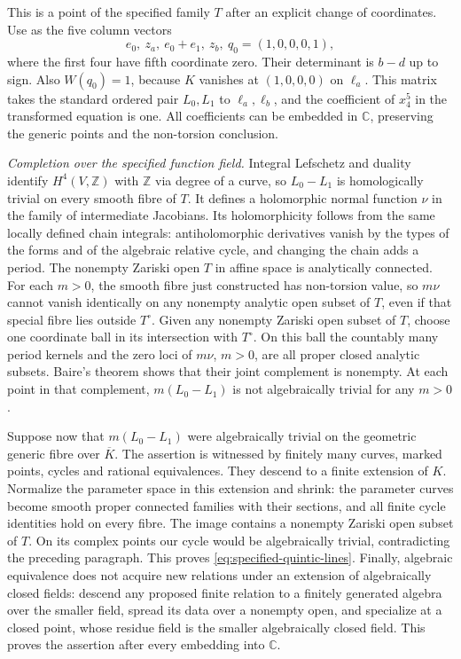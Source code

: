This is a point of the specified family $T$ after an explicit change
of coordinates. Use as the five column vectors
\[
 e_0,\ z_a,\ e_0+e_1,\ z_b,\ q_0=(1,0,0,0,1),
\]
where the first four have fifth coordinate zero. Their determinant
is $b-d$ up to sign. Also $W(q_0)=1$, because $K$ vanishes at
$(1,0,0,0)$ on $\ell_a$. This matrix takes the standard ordered
pair $L_0,L_1$ to $\ell_a,\ell_b$, and the coefficient of $x_4^5$
in the transformed equation is one. All coefficients can be
embedded in $\mathbb C$, preserving the generic points and the
non-torsion conclusion.

\emph{Completion over the specified function field.}
Integral Lefschetz and duality identify $H^4(V,\mathbb Z)$ with
$\mathbb Z$ via degree of a curve, so $L_0-L_1$ is homologically
trivial on every smooth fibre of $T$. It defines a holomorphic
normal function $\nu$ in the family of intermediate Jacobians.
Its holomorphicity follows from the same locally defined chain
integrals: antiholomorphic derivatives vanish by the types of the
forms and of the algebraic relative cycle, and changing the chain
adds a period. The nonempty Zariski open $T$ in affine space is
analytically connected. For each $m>0$, the smooth fibre just
constructed has non-torsion value, so $m\nu$ cannot vanish identically
on any nonempty analytic open subset of $T$, even if that special
fibre lies outside $T^\circ$. Given any nonempty Zariski open subset
of $T$, choose one coordinate ball in its intersection with
$T^\circ$. On this ball the countably many period kernels and the
zero loci of $m\nu$, $m>0$, are all proper closed analytic subsets.
Baire's theorem shows that their joint complement is nonempty.
At each point in that complement, $m(L_0-L_1)$ is not algebraically
trivial for any $m>0$.

Suppose now that $m(L_0-L_1)$ were algebraically trivial on the
geometric generic fibre over $\overline K$. The assertion is
witnessed by finitely many curves, marked points, cycles and rational
equivalences. They descend to a finite extension of $K$. Normalize
the parameter space in this extension and shrink: the parameter
curves become smooth proper connected families with their sections,
and all finite cycle identities hold on every fibre. The image
contains a nonempty Zariski open subset of $T$. On its complex
points our cycle would be algebraically trivial, contradicting the
preceding paragraph. This proves \eqref{eq:specified-quintic-lines}.
Finally, algebraic equivalence does not acquire new relations under
an extension of algebraically closed fields: descend any proposed
finite relation to a finitely generated algebra over the smaller
field, spread its data over a nonempty open, and specialize at a
closed point, whose residue field is the smaller algebraically
closed field. This proves the assertion after every embedding into
$\mathbb C$.


